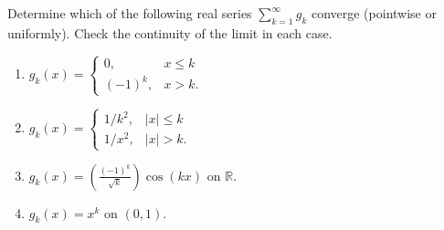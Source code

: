 \documentclass[10pt]{amsart}
\newenvironment{exercise}[1]{%
        \vspace{10mm}
        \renewcommand\themanualtheoreminner{#1}%
  \manualtheoreminner
}\hrulefill{\endmanualtheoreminner}
\begin{document}
\begin{exercise}{Page 317, ex. 3}
	Determine which of the following real series $\sum_{k=1}^{\infty} g_k$ converge (pointwise or uniformly). Check the continuity of the limit in each case.
	\begin{enumerate}
		\item $g_k(x) =
			\begin{cases}
				0, & x \leq k \\
				(-1)^k, & x>k.
			\end{cases}$
		\item $g_k(x) =
			\begin{cases}
				1/k^2, & |x|\leq k \\
				1/x^2, & |x|>k.
			\end{cases}$ 
		\item $g_k(x) = \left( \frac{(-1)^k}{\sqrt{k} } \right) \cos(kx)$ on $\mathbb{R}$.
		\item $g_k(x) = x^k$ on $(0,1)$.
	\end{enumerate}
\end{exercise}
\end{document}
